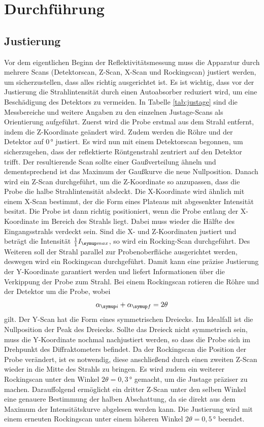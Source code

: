 \section{Durchführung}
\subsection{Justierung}
Vor dem eigentlichen Beginn der Reflektivitätsmessung muss die Apparatur durch mehrere Scans 
(Detektorscan, Z-Scan, X-Scan und Rockingscan) justiert werden, 
um sicherzustellen, dass alles richtig ausgerichtet ist.
Es ist wichtig, dass vor der Justierung die Strahlintensität durch einen Autoabsorber reduziert wird, um 
eine Beschädigung des Detektors zu vermeiden.
In Tabelle \ref{tab:justage} sind die Messbereiche und weitere Angaben zu den einzelnen Justage-Scans als Orientierung aufgeführt.
Zuerst wird die Probe erstmal aus dem Strahl entfernt, indem die Z-Koordinate geändert wird. Zudem werden die 
Röhre und der Detektor auf 0\,° justiert.
Es wird nun mit einem Detektorscan begonnen, um sicherzugehen, dass der reflektierte Röntgenstrahl zentriert auf den Detektor trifft.
Der resultierende Scan sollte einer Gaußverteilung ähneln und dementsprechend ist das Maximum der Gaußkurve die neue Nullposition.
Danach wird ein Z-Scan durchgeführt, um die Z-Koordinate so anzupassen, dass die Probe die halbe Strahlintensität abdeckt.
Die X-Koordinate wird ähnlich mit einem X-Scan bestimmt, der die Form eines Plateaus mit abgesenkter Intensität besitzt. 
Die Probe ist dann richtig positioniert, wenn die Probe entlang der X-Koordinate 
im Bereich des Strahls liegt. Dabei muss wieder die Hälfte des Eingangsstrahls verdeckt sein.
Sind die X- und Z-Koordinaten justiert und beträgt die Intensität $\frac{1}{1} I\idx{max}$, so wird ein Rocking-Scan durchgeführt.
Des Weiteren soll der Strahl parallel zur Probenoberfläche ausgerichtet werden, deswegen wird ein Rockingscan durchgeführt.
Damit kann eine präzise Justierung der Y-Koordinate garantiert werden und liefert Informationen über die Verkippung der Probe 
zum Strahl. Bei einem Rockingscan rotieren die Röhre und der Detektor um die Probe, wobei 
\begin{equation*}
  \alpha\idx{i} + \alpha\idx{f}= 2\theta
\end{equation*}
gilt. Der Y-Scan hat die Form eines symmetrischen Dreiecks. Im Idealfall ist die Nullposition der Peak des Dreiecks.
Sollte das Dreieck nicht symmetrisch sein, muss die Y-Koordinate nochmal nachjustiert werden, so dass die Probe sich im Drehpunkt 
des Diffraktometers befindet. Da der Rockingscan die Position der Probe verändert, 
ist es notwendig, diese anschließend durch einen zweiten Z-Scan wieder in die Mitte des Strahls zu bringen.
Es wird zudem ein weiterer Rockingscan unter den Winkel $2\theta=0,3\,°$ gemacht, um die Justage präziser zu machen.
Darauffolgend ermöglicht ein dritter Z-Scan unter den selben Winkel eine genauere Bestimmung der halben Abschattung, 
da sie direkt aus dem Maximum der Intensitätskurve abgelesen werden kann.
Die Justierung wird mit einem erneuten Rockingscan unter einem höheren Winkel $2\theta=0,5\,°$ beendet.

